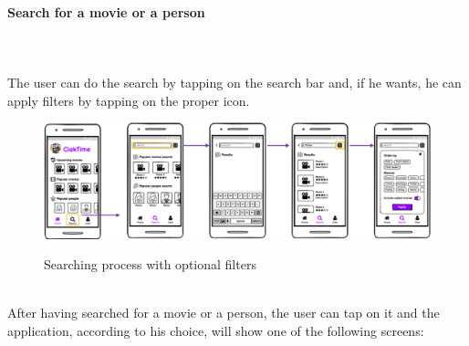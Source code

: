 \documentclass[12pt, a4paper]{article}
\numberwithin{figure}{section}
\begin{document}
\paragraph{Search for a movie or a person}
\mbox{}\\\\
The user can do the search by tapping on the search bar and, if he wants, he can apply filters by tapping 
on the proper icon.\\
\begin{figure}[H]
	\centering
	\includegraphics[width=1\textwidth]{images/mockups/search2.png}\\
	\caption{Searching process with optional filters}
\end{figure}
\mbox{}\\
\noindent
After having searched for a movie or a person, the user can tap on it and the application, according
to his choice, will show one of the following screens:
\end{document}
